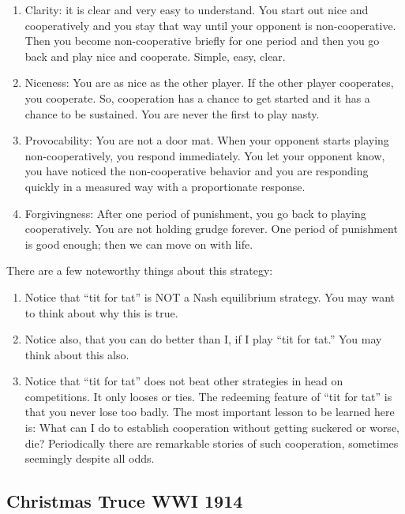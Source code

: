 \documentclass[
]{book}
\providecommand{\tightlist}{%
  \setlength{\itemsep}{0pt}\setlength{\parskip}{0pt}}
\begin{document}
\begin{enumerate}
\def\labelenumi{\arabic{enumi}.}
\tightlist
\item
  Clarity: it is clear and very easy to understand. You start out nice and cooperatively and you stay that way until your opponent is non-cooperative. Then you become non-cooperative briefly for one period and then you go back and play nice and cooperate. Simple, easy, clear.\\
\item
  Niceness: You are as nice as the other player. If the other player cooperates, you cooperate. So, cooperation has a chance to get started and it has a chance to be sustained. You are never the first to play nasty.
\item
  Provocability: You are not a door mat. When your opponent starts playing non-cooperatively, you respond immediately. You let your opponent know, you have noticed the non-cooperative behavior and you are responding quickly in a measured way with a proportionate response.
\item
  Forgivingness: After one period of punishment, you go back to playing cooperatively. You are not holding grudge forever. One period of punishment is good enough; then we can move on with life.
\end{enumerate}

There are a few noteworthy things about this strategy:

\begin{enumerate}
\def\labelenumi{\arabic{enumi}.}
\tightlist
\item
  Notice that ``tit for tat'' is NOT a Nash equilibrium strategy. You may want to think about why this is true.
\item
  Notice also, that you can do better than I, if I play ``tit for tat.'' You may think about this also.
\item
  Notice that ``tit for tat'' does not beat other strategies in head on competitions. It only looses or ties. The redeeming feature of ``tit for tat'' is that you never lose too badly.
  The most important lesson to be learned here is:
  What can I do to establish cooperation without getting suckered or worse, die?
  Periodically there are remarkable stories of such cooperation, sometimes seemingly despite all odds.
\end{enumerate}

\hypertarget{christmas-truce-wwi-1914}{%
\subsection{Christmas Truce WWI 1914}\label{christmas-truce-wwi-1914}}
\end{document}
